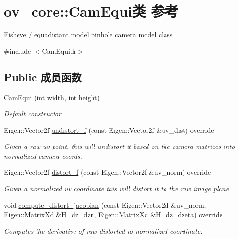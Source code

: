 \hypertarget{classov__core_1_1CamEqui}{}\section{ov\+\_\+core\+:\+:Cam\+Equi类 参考}
\label{classov__core_1_1CamEqui}


Fisheye / equadistant model pinhole camera model class  




{\ttfamily \#include $<$Cam\+Equi.\+h$>$}

\subsection*{Public 成员函数}
\begin{DoxyCompactItemize}
\item 
\hyperlink{classov__core_1_1CamEqui_aac99e3cb833ebf47a7ba2db390ba5f66}{Cam\+Equi} (int width, int height)
\begin{DoxyCompactList}\small\item\em Default constructor \end{DoxyCompactList}\item 
Eigen\+::\+Vector2f \hyperlink{classov__core_1_1CamEqui_a737d6b4b634ae1da976d362158323059}{undistort\+\_\+f} (const Eigen\+::\+Vector2f \&uv\+\_\+dist) override
\begin{DoxyCompactList}\small\item\em Given a raw uv point, this will undistort it based on the camera matrices into normalized camera coords. \end{DoxyCompactList}\item 
Eigen\+::\+Vector2f \hyperlink{classov__core_1_1CamEqui_ac35e3814d053f66a32644321691d8e0f}{distort\+\_\+f} (const Eigen\+::\+Vector2f \&uv\+\_\+norm) override
\begin{DoxyCompactList}\small\item\em Given a normalized uv coordinate this will distort it to the raw image plane \end{DoxyCompactList}\item 
void \hyperlink{classov__core_1_1CamEqui_a68692045d866fbd508a30aab7f3b0637}{compute\+\_\+distort\+\_\+jacobian} (const Eigen\+::\+Vector2d \&uv\+\_\+norm, Eigen\+::\+Matrix\+Xd \&H\+\_\+dz\+\_\+dzn, Eigen\+::\+Matrix\+Xd \&H\+\_\+dz\+\_\+dzeta) override
\begin{DoxyCompactList}\small\item\em Computes the derivative of raw distorted to normalized coordinate. \end{DoxyCompactList}\end{DoxyCompactItemize}
